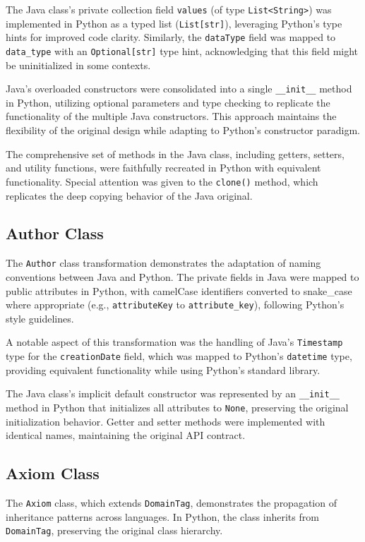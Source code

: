 \documentclass[12pt,a4paper]{article}
\begin{document}
The Java class's private collection field \texttt{values} (of type \texttt{List<String>}) was implemented in Python as a typed list (\texttt{List[str]}), leveraging Python's type hints for improved code clarity. Similarly, the \texttt{dataType} field was mapped to \texttt{data\_type} with an \texttt{Optional[str]} type hint, acknowledging that this field might be uninitialized in some contexts.

Java's overloaded constructors were consolidated into a single \texttt{\_\_init\_\_} method in Python, utilizing optional parameters and type checking to replicate the functionality of the multiple Java constructors. This approach maintains the flexibility of the original design while adapting to Python's constructor paradigm.

The comprehensive set of methods in the Java class, including getters, setters, and utility functions, were faithfully recreated in Python with equivalent functionality. Special attention was given to the \texttt{clone()} method, which replicates the deep copying behavior of the Java original.

\subsection{Author Class}
The \texttt{Author} class transformation demonstrates the adaptation of naming conventions between Java and Python. The private fields in Java were mapped to public attributes in Python, with camelCase identifiers converted to snake\_case where appropriate (e.g., \texttt{attributeKey} to \texttt{attribute\_key}), following Python's style guidelines.

A notable aspect of this transformation was the handling of Java's \texttt{Timestamp} type for the \texttt{creationDate} field, which was mapped to Python's \texttt{datetime} type, providing equivalent functionality while using Python's standard library.

The Java class's implicit default constructor was represented by an \texttt{\_\_init\_\_} method in Python that initializes all attributes to \texttt{None}, preserving the original initialization behavior. Getter and setter methods were implemented with identical names, maintaining the original API contract.

\subsection{Axiom Class}
The \texttt{Axiom} class, which extends \texttt{DomainTag}, demonstrates the propagation of inheritance patterns across languages. In Python, the class inherits from \texttt{DomainTag}, preserving the original class hierarchy.
\end{document}
